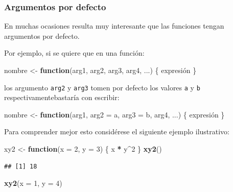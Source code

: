 \documentclass[]{book}
\newenvironment{Shaded}{\begin{snugshade}}{\end{snugshade}}
\newcommand{\KeywordTok}[1]{\textcolor[rgb]{0.13,0.29,0.53}{\textbf{#1}}}
\newcommand{\DataTypeTok}[1]{\textcolor[rgb]{0.13,0.29,0.53}{#1}}
\newcommand{\DecValTok}[1]{\textcolor[rgb]{0.00,0.00,0.81}{#1}}
\newcommand{\StringTok}[1]{\textcolor[rgb]{0.31,0.60,0.02}{#1}}
\newcommand{\ControlFlowTok}[1]{\textcolor[rgb]{0.13,0.29,0.53}{\textbf{#1}}}
\newcommand{\OperatorTok}[1]{\textcolor[rgb]{0.81,0.36,0.00}{\textbf{#1}}}
\newcommand{\NormalTok}[1]{#1}
\begin{document}
\subsubsection{Argumentos por defecto}\label{argumentos-por-defecto}

En muchas ocasiones resulta muy interesante que las funciones tengan
argumentos por defecto.

Por ejemplo, si se quiere que en una función:

\begin{Shaded}
\begin{Highlighting}[]
\NormalTok{nombre <-}\StringTok{ }\ControlFlowTok{function}\NormalTok{(arg1, arg2, arg3, arg4, ...) \{ expresión \}}
\end{Highlighting}
\end{Shaded}

los argumento \texttt{arg2} y \texttt{arg3} tomen por defecto los
valores \texttt{a} y \texttt{b} respectivamentebastaría con escribir:

\begin{Shaded}
\begin{Highlighting}[]
\NormalTok{nombre <-}\StringTok{ }\ControlFlowTok{function}\NormalTok{(arg1, }\DataTypeTok{arg2 =}\NormalTok{ a, }\DataTypeTok{arg3 =}\NormalTok{ b, arg4, ...) \{ expresión \}}
\end{Highlighting}
\end{Shaded}

Para comprender mejor esto considérese el siguiente ejemplo ilustrativo:

\begin{Shaded}
\begin{Highlighting}[]
\NormalTok{xy2 <-}\StringTok{ }\ControlFlowTok{function}\NormalTok{(}\DataTypeTok{x =} \DecValTok{2}\NormalTok{, }\DataTypeTok{y =} \DecValTok{3}\NormalTok{) \{ x }\OperatorTok{*}\StringTok{ }\NormalTok{y}\OperatorTok{^}\DecValTok{2}\NormalTok{ \}}
\KeywordTok{xy2}\NormalTok{()}
\end{Highlighting}
\end{Shaded}

\begin{verbatim}
## [1] 18
\end{verbatim}

\begin{Shaded}
\begin{Highlighting}[]
\KeywordTok{xy2}\NormalTok{(}\DataTypeTok{x =} \DecValTok{1}\NormalTok{, }\DataTypeTok{y =} \DecValTok{4}\NormalTok{)}
\end{Highlighting}
\end{Shaded}
\end{document}
